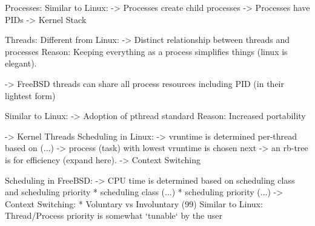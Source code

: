 
Processes:
	Similar to Linux:
		-> Processes create child processes
		-> Processes have PIDs
		-> Kernel Stack

Threads:
	Different from Linux:
		-> Distinct relationship between threads and processes
			Reason:
			Keeping everything as a process simplifies things (linux is elegant).

		-> FreeBSD threads can share all process resources including PID (in their lightest form)

	Similar to Linux:
		-> Adoption of pthread standard
			Reason:
			Increased portability

		-> Kernel Threads
	Scheduling in Linux:
		-> vruntime is determined per-thread based on (...)
		-> process (task) with lowest vruntime is chosen next
		-> an rb-tree is for efficiency (expand here).
		-> Context Switching
	
	Scheduling in FreeBSD:
		-> CPU time is determined based on scheduling class and scheduling priority
			* scheduling class (...)
			* scheduling priority (...)
		-> Context Switching: 
			* Voluntary vs Involuntary (99)
	Similar to Linux:
		Thread/Process priority is somewhat `tunable` by the user

